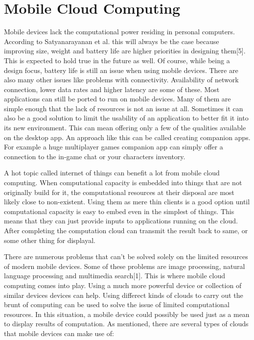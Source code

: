 \documentclass[conference]{IEEEtran}
\begin{document}
\section{Mobile Cloud Computing}
Mobile devices lack the computational power residing in personal computers. According to Satyanarayanan et al. this will always be the case because improving size, weight and battery life are higher priorities in designing them[5]. This is expected to hold true in the future as well. Of course, while being a design focus, battery life is still an issue when using mobile devices. There are also many other issues like problems with connectivity. Availability of network connection, lower data rates and higher latency are some of these. Most applications can still be ported to run on mobile devices. Many of them are simple enough that the lack of resources is not an issue at all. Sometimes it can also be a good solution to limit the usability of an application to better fit it into its new environment. This can mean offering only a few of the qualities available on the desktop app. An approach like this can be called creating companion apps. For example a huge multiplayer games companion app can simply offer a connection to the in-game chat or your characters inventory.
\par
A hot topic called internet of things can benefit a lot from mobile cloud computing. When computational capacity is embedded into things that are not originally build for it, the computational resources at their disposal are most likely close to non-existent. Using them as mere thin clients is a good option until computational capacity is easy to embed even in the simplest of things. This means that they can just provide inputs to applications running on the cloud. After completing the computation cloud can transmit the result back to same, or some other thing for displayal.
\par
There are numerous problems that can't be solved solely on the limited resources of modern mobile devices. Some of these problems are image processing, natural language processing and multimedia search[1]. This is where mobile cloud computing comes into play. Using a much more powerful device or collection of similar devices devices can help.  Using differect kinds of clouds to carry out the brunt of computing can be used to solve the issue of limited computational resources. In this situation, a mobile device could possibly be used just as a mean to display results of computation. As mentioned, there are several types of clouds that mobile devices can make use of:\\
\end{document}
